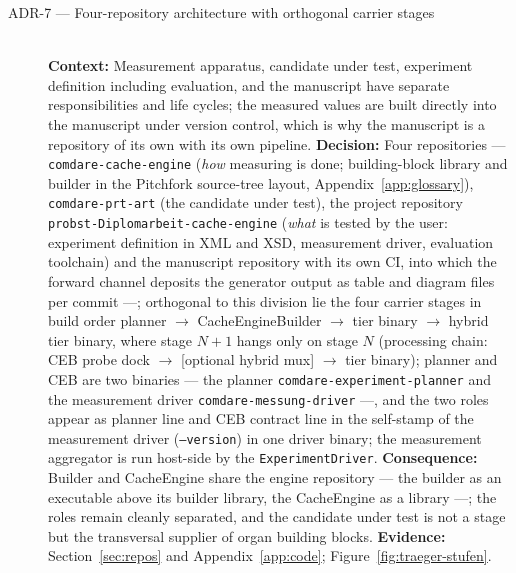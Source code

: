 \begin{description}
  \item[ADR-7 --- Four-repository architecture with orthogonal carrier stages]\hfill\\
  \textbf{Context:} Measurement apparatus, candidate under test, experiment definition including evaluation, and
  the manuscript have separate responsibilities and life cycles; the measured values are built
  directly into the manuscript under version control, which is why the manuscript is a repository
  of its own with its own pipeline.
  \textbf{Decision:} Four repositories --- \texttt{comdare-cache-engine} (\emph{how} measuring is
  done; building-block library and builder in the Pitchfork source-tree layout,
  Appendix~\ref{app:glossary}), \texttt{comdare-prt-art} (the candidate under test), the project repository
  \texttt{probst-Diplomarbeit-cache-engine} (\emph{what} is tested by the user: experiment
  definition in XML and XSD, measurement driver, evaluation toolchain) and the manuscript
  repository with its own CI, into which the forward channel deposits the generator output as table
  and diagram files per commit ---; orthogonal to this division lie the four carrier stages in build order
  planner $\to$ CacheEngineBuilder $\to$ tier binary $\to$ hybrid tier binary, where stage $N+1$ hangs
  only on stage $N$ (processing chain: CEB probe dock $\to$ [optional hybrid mux] $\to$ tier binary);
  planner and CEB are two binaries --- the planner
  \texttt{comdare-experiment-planner} and the measurement driver \texttt{comdare-messung-driver}
  ---, and the two roles appear as planner line and CEB contract line in the self-stamp of the
  measurement driver (\texttt{--version}) in one driver binary; the measurement aggregator is run
  host-side by the \texttt{ExperimentDriver}.
  \textbf{Consequence:} Builder and CacheEngine share the engine repository --- the builder as an
  executable above its builder library, the CacheEngine as a library ---; the roles remain cleanly
  separated, and the candidate under test is not a stage but the transversal supplier of organ building blocks.
  \textbf{Evidence:} Section~\ref{sec:repos} and Appendix~\ref{app:code};
  Figure~\ref{fig:traeger-stufen}.


\end{description}
